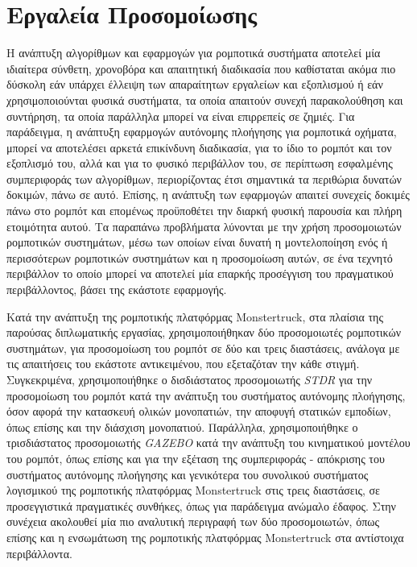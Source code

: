 \section{Εργαλεία Προσομοίωσης} \label{sec:simulation_tools}
Η ανάπτυξη αλγορίθμων και εφαρμογών για ρομποτικά συστήματα αποτελεί μία ιδιαίτερα σύνθετη, χρονοβόρα και απαιτητική διαδικασία που καθίσταται ακόμα πιο δύσκολη εάν υπάρχει έλλειψη των απαραίτητων εργαλείων και εξοπλισμού ή εάν χρησιμοποιούνται φυσικά συστήματα, τα οποία απαιτούν συνεχή παρακολούθηση και συντήρηση, τα οποία παράλληλα μπορεί να είναι επιρρεπείς σε ζημιές. Για παράδειγμα, η ανάπτυξη εφαρμογών αυτόνομης πλοήγησης για ρομποτικά οχήματα, μπορεί να αποτελέσει αρκετά επικίνδυνη διαδικασία, για το ίδιο το ρομπότ και τον εξοπλισμό του, αλλά και για το φυσικό περιβάλλον του, σε περίπτωση εσφαλμένης συμπεριφοράς των αλγορίθμων, περιορίζοντας έτσι σημαντικά τα περιθώρια δυνατών δοκιμών, πάνω σε αυτό. Επίσης, η ανάπτυξη των εφαρμογών απαιτεί συνεχείς δοκιμές πάνω στο ρομπότ και επομένως προϋποθέτει την διαρκή φυσική παρουσία και πλήρη ετοιμότητα αυτού. Τα παραπάνω προβλήματα λύνονται με την χρήση προσομοιωτών ρομποτικών συστημάτων, μέσω των οποίων είναι δυνατή η μοντελοποίηση ενός ή περισσότερων ρομποτικών συστημάτων και η προσομοίωση αυτών, σε ένα τεχνητό περιβάλλον το οποίο μπορεί να αποτελεί μία επαρκής προσέγγιση του πραγματικού περιβάλλοντος, βάσει της εκάστοτε εφαρμογής.

\bigskip
Κατά την ανάπτυξη της ρομποτικής πλατφόρμας Monstertruck, στα πλαίσια της παρούσας διπλωματικής εργασίας, χρησιμοποιήθηκαν δύο προσομοιωτές ρομποτικών συστημάτων, για προσομοίωση του ρομπότ σε δύο και τρεις διαστάσεις, ανάλογα με τις απαιτήσεις του εκάστοτε αντικειμένου, που εξεταζόταν την κάθε στιγμή. Συγκεκριμένα, χρησιμοποιήθηκε ο δισδιάστατος προσομοιωτής \textit{STDR} \cite{stdr} για την προσομοίωση του ρομπότ κατά την ανάπτυξη του συστήματος αυτόνομης πλοήγησης, όσον αφορά την κατασκευή ολικών μονοπατιών, την αποφυγή στατικών εμποδίων, όπως επίσης και την διάσχιση μονοπατιού. Παράλληλα, χρησιμοποιήθηκε ο τρισδιάστατος προσομοιωτής \textit{GAZEBO} \cite{gazebo} κατά την ανάπτυξη του κινηματικού μοντέλου του ρομπότ, όπως επίσης και για την εξέταση της συμπεριφοράς - απόκρισης του συστήματος αυτόνομης πλοήγησης και γενικότερα του συνολικού συστήματος λογισμικού της ρομποτικής πλατφόρμας Monstertruck στις τρεις διαστάσεις, σε προσεγγιστικά πραγματικές συνθήκες, όπως για παράδειγμα ανώμαλο έδαφος. Στην συνέχεια ακολουθεί μία πιο αναλυτική περιγραφή των δύο προσομοιωτών, όπως επίσης και η ενσωμάτωση της ρομποτικής πλατφόρμας Monstertruck στα αντίστοιχα περιβάλλοντα.

